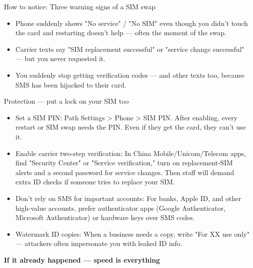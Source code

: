 \begin{tcbinfo}{How to notice: Three warning signs of a SIM swap}
\begin{itemize}
  \item Phone suddenly shows "No service" / "No SIM" even though you didn't touch the card and restarting doesn't help — often the moment of the swap.
  \item Carrier texts say "SIM replacement successful" or "service change successful" — but you never requested it.
  \item You suddenly stop getting verification codes — and other texts too, because SMS has been hijacked to their card.
\end{itemize}

\end{tcbinfo}

\begin{tcbwarn}{Protection — put a lock on your SIM too}
\begin{itemize}
  \item Set a SIM PIN: Path Settings > Phone > SIM PIN. After enabling, every restart or SIM swap needs the PIN. Even if they get the card, they can't use it.
  \item Enable carrier two-step verification: In China Mobile/Unicom/Telecom apps, find "Security Center" or "Service verification," turn on replacement-SIM alerts and a second password for service changes. Then staff will demand extra ID checks if someone tries to replace your SIM.
  \item Don't rely on SMS for important accounts: For banks, Apple ID, and other high-value accounts, prefer authenticator apps (Google Authenticator, Microsoft Authenticator) or hardware keys over SMS codes.
  \item Watermark ID copies: When a business needs a copy, write "For XX use only" — attackers often impersonate you with leaked ID info.
\end{itemize}

\end{tcbwarn}

\textbf{If it already happened — speed is everything}\par

